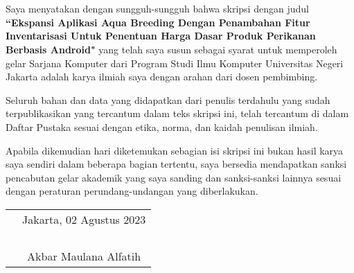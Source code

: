 \chapter*{}

\begin{spacing}{1.5}

Saya menyatakan dengan sungguh-sungguh bahwa skripsi dengan judul \textbf{“Ekspansi Aplikasi Aqua Breeding Dengan Penambahan Fitur Inventarisasi Untuk Penentuan Harga Dasar Produk Perikanan Berbasis Android"} yang telah saya susun sebagai syarat untuk memperoleh gelar Sarjana Komputer dari Program Studi Ilmu Komputer Universitas Negeri Jakarta adalah karya ilmiah saya dengan arahan dari dosen pembimbing.

Seluruh bahan dan data yang didapatkan dari penulis terdahulu yang sudah terpublikasikan yang tercantum dalam teks skripsi ini, telah tercantum di dalam Daftar Pustaka sesuai dengan etika, norma, dan kaidah penulisan ilmiah.

Apabila dikemudian hari diketemukan sebagian isi skripsi ini bukan hasil karya saya sendiri dalam beberapa bagian tertentu, saya bersedia mendapatkan sanksi pencabutan gelar akademik yang saya sanding dan sanksi-sanksi lainnya sesuai dengan peraturan perundang-undangan yang diberlakukan.

\end{spacing}

\vspace{2cm}

\begin{tabular}{p{8.5cm}c}
	&Jakarta, 02 Agustus 2023\\
	&\\
	&\\
	&\\
	&\\
	&Akbar Maulana Alfatih
\end{tabular}